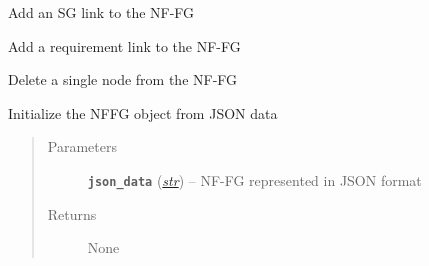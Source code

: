 \documentclass[letterpaper,10pt,english]{sphinxmanual}
\begin{document}
\begin{fulllineitems}
\begin{fulllineitems}
\label{util/nffg:escape.util.nffg.AbstractNFFG.add_sglink}
Add an SG link to the NF-FG

\end{fulllineitems}


\begin{fulllineitems}
\label{util/nffg:escape.util.nffg.AbstractNFFG.add_req}
Add a requirement link to the NF-FG

\end{fulllineitems}


\begin{fulllineitems}
\label{util/nffg:escape.util.nffg.AbstractNFFG.del_node}
Delete a single node from the NF-FG

\end{fulllineitems}


\begin{fulllineitems}
\label{util/nffg:escape.util.nffg.AbstractNFFG._init_from_json}
Initialize the NFFG object from JSON data
\begin{quote}\begin{description}
\item[{Parameters}] \leavevmode
\textbf{\texttt{json\_data}} (\href{https://docs.python.org/2.7/library/functions.html\#str}{\emph{str}}) -- NF-FG represented in JSON format

\item[{Returns}] \leavevmode
None

\end{description}\end{quote}

\end{fulllineitems}


\begin{fulllineitems}
\label{util/nffg:escape.util.nffg.AbstractNFFG.load_from_file}
\end{fulllineitems}


\end{fulllineitems}
\end{document}

